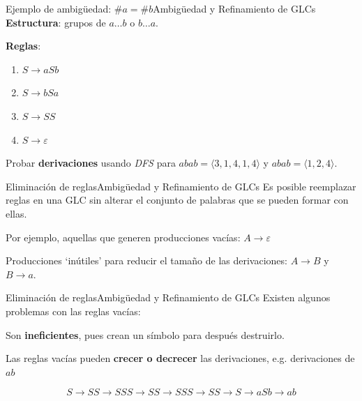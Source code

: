 \documentclass[spanish]{beamer}
\begin{document}
\begin{frame}{Ejemplo de ambigüedad: $\#a = \#b$}{Ambigüedad y Refinamiento de GLCs}
    \textbf{Estructura}: grupos de $a \dots b$ o $b \dots a$. \pause

    \bigskip

    \textbf{Reglas}:
    \begin{enumerate}
        \item $S \to aSb$
        \item $S \to bSa$
        \item $S \to SS$
        \item $S \to \varepsilon$
    \end{enumerate} \pause

    \bigskip

    Probar \textbf{derivaciones} usando \textit{DFS} para $abab = \langle 3, 1, 4, 1, 4  \rangle$ y $ abab = \langle 1, 2, 4 \rangle$.
\end{frame}

\begin{frame}{Eliminación de reglas}{Ambigüedad y Refinamiento de GLCs}
    Es posible reemplazar reglas en una GLC sin alterar el conjunto de palabras que se pueden formar con ellas. \pause

    \bigskip

    Por ejemplo, aquellas que generen producciones vacías: $A \to \varepsilon$ \pause

    \bigskip

    Producciones `inútiles' para reducir el tamaño de las derivaciones: $A \to B$ y $B \to a$.
\end{frame}

\begin{frame}{Eliminación de reglas}{Ambigüedad y Refinamiento de GLCs}
    Existen algunos problemas con las reglas vacías: \pause

    \bigskip

    Son \textbf{ineficientes}, pues crean un símbolo para después destruirlo. \pause

    \bigskip

    Las reglas vacías pueden \textbf{crecer o decrecer} las derivaciones, e.g. derivaciones de $ab$ \pause

    \bigskip

    $$S \to SS \to SSS \to SS \to SSS \to SS \to S \to aSb \to ab$$
\end{frame}
\end{document}
